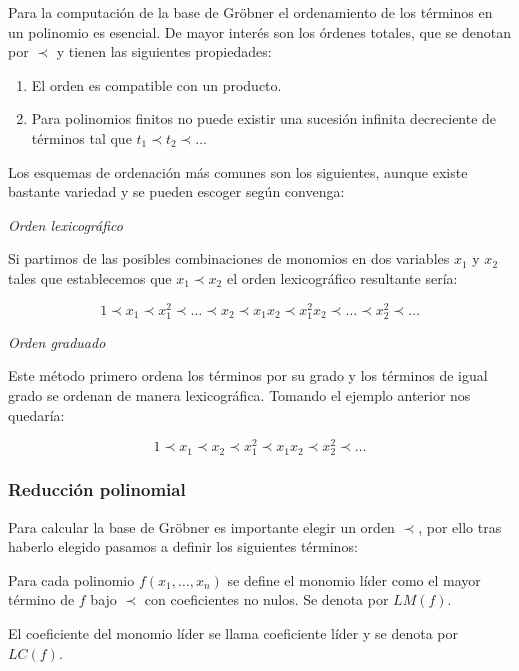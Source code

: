 Para la computación de la base de Gröbner el ordenamiento de los términos en un polinomio es esencial. De mayor interés son los órdenes totales, que se denotan por $\prec$ y tienen las siguientes propiedades:

\begin{enumerate}
    \item El orden es compatible con un producto.
    \item Para polinomios finitos no puede existir una sucesión infinita decreciente de términos tal que $t_1 \prec t_2 \prec \dotso$
\end{enumerate}

Los esquemas de ordenación más comunes son los siguientes, aunque existe bastante variedad y se pueden escoger según convenga:
\\
\par
\textit{Orden lexicográfico}
\\ \par
Si partimos de las posibles combinaciones de monomios en dos variables $x_1$ y $x_2$ tales que establecemos que $x_1 \prec x_2$ el orden lexicográfico resultante sería:

$$1 \prec x_1 \prec x_1^2 \prec \dotso \prec x_2 \prec x_1 x_2 \prec x_1^2 x_2 \prec \dotso \prec x_2^2 \prec \dotso$$

\bigskip
\textit{Orden graduado}
\\ \par
Este método primero ordena los términos por su grado y los términos de igual grado se ordenan de manera lexicográfica. Tomando el ejemplo anterior nos quedaría:

$$1 \prec x_1 \prec x_2  \prec x_1^2 \prec x_1 x_2 \prec x_2^2 \prec \dotso$$

\subsubsection*{Reducción polinomial}

Para calcular la base de Gröbner es importante elegir un orden $\prec$, por ello tras haberlo elegido pasamos a definir los siguientes términos:

\begin{definition}
Para cada polinomio $f(x_1, \dotso, x_n)$ se define el monomio líder como el mayor término de $f$ bajo $\prec$ con coeficientes no nulos. Se denota por $LM(f)$.
\end{definition}

\begin{remark}
El coeficiente del monomio líder se llama coeficiente líder y se denota por $LC(f)$.
\end{remark}

